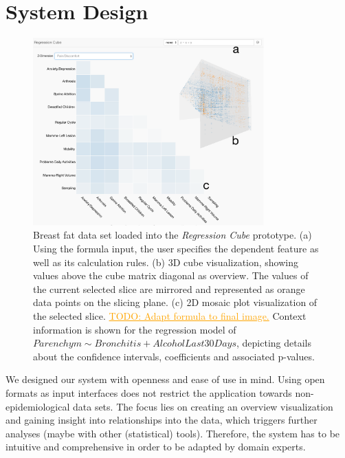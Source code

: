 \documentclass[journal]{style/vgtc} 			          %
\newcommand{\com}[1]{\textcolor{orange}{\uline{#1}}}
\begin{document}
\section{System Design} \label{sec:SystemDesign}
\begin{figure}[htb]
 \centering
 \includegraphics[width=3.5in]{figures/system}
 \caption{
 Breast fat data set loaded into the \emph{Regression Cube} prototype.
 (a) Using the formula input, the user specifies the dependent feature as well as its calculation rules.
 (b) 3D cube visualization, showing values above the cube matrix diagonal as overview.
 The values of the current selected slice are mirrored and represented as orange data points on the slicing plane.
 (c) 2D mosaic plot visualization of the selected slice.
 \com{TODO: Adapt formula to final image.}
 Context information is shown for the regression model of $Parenchym \sim Bronchitis + AlcoholLast30Days$, depicting details about the confidence intervals, coefficients and associated p-values.
 }
  \label{fig:System}
\end{figure}
We designed our system with openness and ease of use in mind.
Using open formats as input interfaces does not restrict the application towards non-epidemiological data sets.
The focus lies on creating an overview visualization and gaining insight into relationships into the data, which triggers further analyses (maybe with other (statistical) tools).
Therefore, the system has to be intuitive and comprehensive in order to be adapted by domain experts.
\\\\
\end{document}
